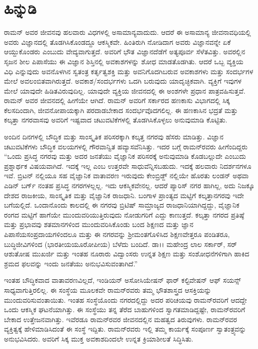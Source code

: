 
\chapter*{ಹಿನ್ನುಡಿ}

ರಾಮನ್ ಅವರ ಜೀವನವು ಹಲವಾರು ವಿಧಗಳಲ್ಲಿ ಅಸಾಮಾನ್ಯವಾದುದು. ಆದರೆ ಈ ಅಸಾಮಾನ್ಯ ಜೀವನಾವಧಿಯಲ್ಲಿ ಅವರು ವಿಜ್ಞಾನದಲ್ಲಿ ತೊಡಗಿಸಿಕೊಂಡದ್ದೂ ಆಕಸ್ಮಿಕವೇ. ಹಿಂತಿರುಗಿ ನೋಡಿದಾಗ ಅವರು ವಿಜ್ಞಾನವನ್ನೇ ಏಕೆ ಆಯ್ದುಕೊಂಡರು ಎಂಬುದು ವೇದ್ಯವಾಗುತ್ತದೆ. ಅವರಿಗೆ ಭೌತ ವಿಜ್ಞಾನದೆಡೆಗೆ ಅತ್ಯಪೂರ್ವ ಸೆಳೆತವಿತ್ತು. ಅವರಲ್ಲಿನ ಸೃಜನ ಶೀಲ ಪಿಪಾಸೆಯು ಈ ವಿಜ್ಞಾನ ಶಿಸ್ತಿನಲ್ಲಿ ಅವಕಾಶಗಳನ್ನು ಶೋಧ ಮಾಡತೊಡಗಿತು. ಆದರೆ ಒಬ್ಬ ವ್ಯಕ್ತಿಯ ವಿಧಿ ಎನ್ನುವುದು ಅವನೊಳಗಿನ ಸ್ವತಂತ್ರ ಕರ್ತೃತ್ವಶಕ್ತಿ ಮತ್ತು ಅವನಿಗೊದಗಿಬರುವ ಅವಕಾಶಗಳು ಮತ್ತು ಸಂದರ್ಭಗಳ ಮೇಲೆ ಅವಲಂಬಿತವಾಗಿರುತ್ತದೆ. ಅವಕಾಶ/ಸಂದರ್ಭಗಳು ಒದಗಿ ಬರುವುದು ಯಾದೃಚ್ಛಿಕವಾಗಿ. ವ್ಯಕ್ತಿಗೆ ಇವುಗಳ ಮೇಲೆ ಯಾವುದೇ ಹಿಡಿತವಿರುವುದಿಲ್ಲ. ಯಾವುದೇ ವ್ಯಕ್ತಿಯ ಜೀವನದಲ್ಲಿ ಈ ಅಂಶಗಳೇ ಪ್ರಧಾನ ಪಾತ್ರವಹಿಸುತ್ತವೆ. ರಾಮನ್ ಅವರ ಜೀವನದಲ್ಲಿ ಹೀಗೆಯೇ ಆಗಿದೆ. ರಾಮನ್ ಅವರಿಗೆ ಸರ್ಕಾರದ ಹಣಕಾಸು ವಿಭಾಗದಲ್ಲಿ ಸಿಕ್ಕ ಕೆಲಸದಿಂದಾಗಿ, ಜೀವನೋಪಾಯಕ್ಕಾಗಿ ಪರದಾಡಬೇಕಾದ ಸಂದರ್ಭವೊದಗಲಿಲ್ಲ. ಈ ಹಣಕಾಸಿನ ಭದ್ರತೆ ಮತ್ತು ಕಲ್ಕತ್ತಾ ನಗರವಾಸವು ಅವರಿಗೆ ಇಷ್ಟವಾದ ಚಟುವಟಿಕೆಗಳಲ್ಲಿ ತೊಡಗಿಸಿಕೊಳ್ಳಲು ಅನುವುಮಾಡಿ ಕೊಟ್ಟಿತು.

ಅಂದಿನ ದಿನಗಳಲ್ಲಿ ಬೌದ್ಧಿಕ ಮತ್ತು ಸಾಂಸ್ಕೃತಿಕ ಪರಿಸರಕ್ಕಾಗಿ ಕಲ್ಕತ್ತ ನಗರವು ಹೆಸರು ಮಾಡಿತ್ತು. ವಿಜ್ಞಾನ ಚಟುವಟಿಕೆಗಳು ಬೌದ್ಧಿಕ ವಲಯಗಳಲ್ಲಿ ಗೌರವಾನ್ವಿತ ಹವ್ಯಾಸವೆನಿಸಿತ್ತು. ಇದರ ಬಗ್ಗೆ ರಾಮನ್‍ರವರು ಹೀಗೆಂದಿದ್ದರು “ಒಂದು ಪ್ರಸಿದ್ಧ ನಗರವು ಮತ್ತು ಅದರ ಜನತೆಯು ವೈಜ್ಞಾನಿಕ ಪರಿಸರಕ್ಕೆ ಅನುವುಮಾಡಿ ಕೊಡಬಲ್ಲುದೇ ಎಂಬುದು ಪ್ರಶ್ನಾರ್ಥಕ ವಿಷಯವಾಗಿದೆ. ಇದಕ್ಕೆ ಇಲ್ಲ ಎಂಬ ಉತ್ತರವೇ ಸಾಧುವೆನ್ನಿಸಬಹುದು. ಇದಕ್ಕೆ ಹಲವಾರು ನಿದರ್ಶನಗಳೂ ಇವೆ. ಬ್ರಿಟನ್ ನಲ್ಲಿಯೂ ಸಹ ವೈಜ್ಞಾನಿಕ ವಾತಾವರಣ ಇರುವುದು ಕೇಂಬ್ರಿಡ್ಜ್ ನಲ್ಲಿಯೇ ಹೊರತು ಲಂಡನ್ ಅಥವಾ ಎಡಿನ್ ಬರ್ಗ್ ನಂತಹ ಪ್ರಸಿದ್ಧ ನಗರಗಳಲ್ಲಲ್ಲ. ಇದು ಆಕಸ್ಮಿಕವೇನಲ್ಲ. ಆದರೆ ಪ್ಯಾರಿಸ್ ನಗರ ಹಾಗಿಲ್ಲ, ಅದು ನಿಜಕ್ಕೂ ದೇಶದ ರಾಜಕೀಯ, ಸಾಂಸ್ಕೃತಿಕ ಮತ್ತು ವೈಜ್ಞಾನಿಕ ರಾಜಧಾನಿ. ಬಂಗಾಳ ಪ್ರಾಂತ್ಯದ ಮಟ್ಟಿಗೆ ಕಲ್ಕತ್ತಾನಗರವು ಇದೇ ಬಗೆಯಲ್ಲಿದೆ. ಒಂದಾನೊಂದು ಕಾಲದಲ್ಲಿ ಈ ನಗರವು ಬ್ರಿಟಿಷ್ ಸಾಮ್ರಾಜ್ಯದ ರಾಜಧಾನಿಯಾಗಿದ್ದದ್ದು, ವೈಜ್ಞಾನಿಕ ರಂಗದ ಮಟ್ಟಿಗೆ ಹಾಗೆಯೇ ಮುಂದುವರಿಯುತ್ತಿರುವುದು ನೋಡುಗರಿಗೆ ಎದ್ದು ಕಾಣುತ್ತದೆ. ಕಲ್ಕತ್ತಾ ನಗರದ ಪ್ರತಿಷ್ಠೆ ಮತ್ತು ಪ್ರಭಾವವು ಶತಮಾನಗಳಿಂದ ಮುಂದುವರಿಸಿಕೊಂಡು ಬಂದ ಶಿಕ್ಷಣದ ಮತ್ತು ಜ್ಞಾನ ಪಿಪಾಸೆಯ\break ಸಂಪ್ರದಾಯಗಳಿಂದಲೂ ಮತ್ತು ಈ ನಗರವನ್ನು ಶ‍್ರೀಮಂತಗೊಳಿಸಿದ ಶಿಕ್ಷಣವೇತ್ತರೂ ಪಂಡಿತರೂ, ಬುದ್ಧಿಜೀವಿಗಳಿಂದ (ಭಾರತೀಯ\enginline{-}ಯೂರೋಪೀಯ) ಬೆಳೆದು ಬಂದಿದೆ. ಡಾ।। ಮಹೇಂದ್ರ ಲಾಲ ಸರ್ಕಾರ್, ಸರ್ ಆಶುತೋಷ ಮುಖರ್ಜಿ ಮತ್ತು ಇಂತಹ ನೂರಾರು ವಿದ್ವಾಂಸರು ಉನ್ನತ ಶಿಕ್ಷಣ ಮತ್ತು ಸಂಶೋಧನೆಗಳಿಗಾಗಿ ಹಾಕಿದ ಶ್ರಮದ ಫಲವನ್ನು ಇಂದು ಜನತೆಯು ಅನುಭವಿಸುವಂತಾಗಿದೆ.”

ಇಂತಹ ಬೌದ್ಧಿಕವಾದ ವಾತಾವರಣವಿಲ್ಲದೆ, ಇಂಡಿಯನ್ ಅಸೋಸಿಯೇಷನ್ ಫಾರ್ ಕಲ್ಟಿವೇಷನ್ ಆಫ್ ಸಯನ್ಸ್ ಸಾಧ್ಯವಾಗುತ್ತಿರಲಿಲ್ಲ. ಈ ಸಂಸ್ಥೆಯ ಮೂಲಕವೇ ರಾಮನ್‍ರವರು ತಮ್ಮ ಭೌತಶಾಸ್ತ್ರದ ಆಸಕ್ತಿಯನ್ನು ಮುಂದುವರಿಸುವಂತಾಯಿತು. ಇಂತಹ ಸಂಸ್ಥೆಯೊಂದು ನಗರದಲ್ಲಿದ್ದು ಅದರ ಪರಿಚಯವು ರಾಮನ್‍ರವರಿಗೆ ಆದದ್ದೇ ಒಂದು ಆಕಸ್ಮಿಕ ಘಟನೆಯಾಗಿತ್ತು. ಈ ಸಂಸ್ಥೆಯು ತನ್ನ ತೆರೆದ ಬಾಹುಗಳಿಂದ ಸ್ವಾಗತಮಾಡಿದ್ದಷ್ಟೇ, ರಾಮನ್‍ರವರಿಗೆ ಬೇಕಾದ ಉತ್ತೇಜನವಾಗಿತ್ತು. ಇವೆರಡೂ ರಾಮನ್‍ರವರ ಜೀವನದಲ್ಲಿನ ಮಹತ್ವದ ತಿರುವುಗಳು. ರಾಮನ್‍ರವರ ವ್ಯಕ್ತಿತ್ವಕ್ಕೆ ಹೇಳಿಮಾಡಿಸಿದಂತೆ ಈ ಸಂಸ್ಥೆ ಇದ್ದಿತು. ರಾಮನ್‍ರವರು ಇಲ್ಲಿ ತಮ್ಮ ಕಾರ್ಯಕ್ಕೆ ಸಂಪೂರ್ಣ ಸ್ವಾತಂತ್ರ್ಯವನ್ನು ಅನುಭವಿಸಿದರು. ಅವರಿಗೆ ಸಿಕ್ಕ ಮುಕ್ತ ಅವಕಾಶದಿಂದಲೇ ಉನ್ನತ ಕ್ರಿಯಾಶೀಲತೆ ಸಿದ್ಧಿಸಿತು.

